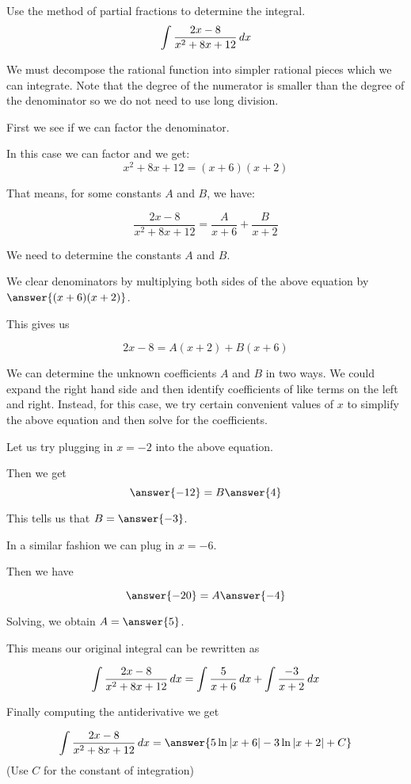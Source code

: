 \documentclass{ximera}
\author{Jason Miller}
\begin{document}
\begin{exercise}
Use the method of partial fractions to determine the integral.
\[
\int \frac{2x-8}{x^2+8x+12} \mathop{}\!d x
\]

We must decompose the rational function into simpler rational pieces which we can integrate. 
Note that the degree of the numerator is smaller than the degree of the denominator so we do not need 
to use long division. 

First we see if we can factor the denominator. 

In this case we can factor and we get:
\[
x^{2}+8x+12=(x+6)(x+2)
\]

That means, for some constants $A$ and $B$, we have:

\[
\frac{2x-8}{x^{2}+8x+12}= \frac{A}{x+6} + \frac{B}{x+2}
\]

We need to determine the constants $A$ and $B$. 

We clear denominators by multiplying both sides of the above equation by $\answer{(x+6)(x+2)}$. 

This gives us 

\[
2x-8=A(x+2) + B(x+6)
\]

We can determine the unknown coefficients $A$ and $B$ in two ways. 
We could expand the right hand side and then identify coefficients of like terms on the left and right.
Instead, for this case, we try certain convenient values of $x$ to simplify the above equation and then solve for the coefficients. 

Let us try plugging in $x=-2$ into the above equation. 

Then we get 
\[
\answer{-12 }= B\answer{4}
\]

This tells us that $B=\answer{ -3}$. 


In a similar fashion we can plug in $x=-6$. 

Then we have 

\[
\answer{-20}=A\answer{-4}
\]

Solving, we obtain $A=\answer{5}$. 

\begin{exercise}
This means our original integral can be rewritten as 

\[
\int \frac{2x-8}{x^{2}+8x+12} \mathop{}\!d x= \int \frac{5}{x+6} \mathop{}\!d x + \int \frac{-3}{x+2} \mathop{}\!d x
\]

 Finally computing the antiderivative we get 

\[
\int \frac{2x-8}{x^{2}+8x+12} \d x= \answer{ 5\ln|x+6|-3\ln|x+2| + C }
\]
(Use $C$ for the constant of integration)

\end{exercise}
\end{exercise}
\end{document}
